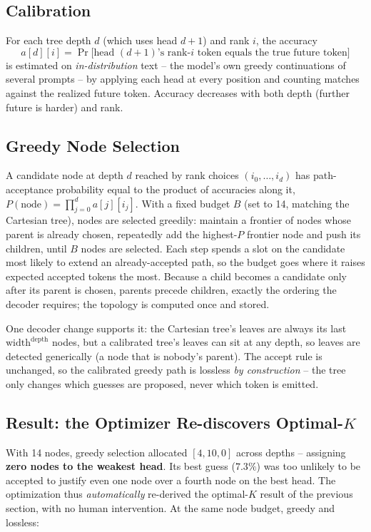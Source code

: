 \documentclass[12pt, a4paper]{article}
\begin{document}
\subsection{Calibration}
For each tree depth $d$ (which uses head $d{+}1$) and rank $i$, the accuracy
\[
a[d][i] = \Pr\big[\text{head } (d{+}1)\text{'s rank-}i \text{ token equals the true future token}\big]
\]
is estimated on \emph{in-distribution} text -- the model's own greedy continuations of several
prompts -- by applying each head at every position and counting matches against the realized
future token. Accuracy decreases with both depth (further future is harder) and rank.

\subsection{Greedy Node Selection}
A candidate node at depth $d$ reached by rank choices $(i_0,\dots,i_d)$ has path-acceptance
probability equal to the product of accuracies along it,
$P(\text{node}) = \prod_{j=0}^{d} a[j][i_j]$. With a fixed budget $B$ (set to 14, matching the
Cartesian tree), nodes are selected greedily: maintain a frontier of nodes whose parent is
already chosen, repeatedly add the highest-$P$ frontier node and push its children, until $B$
nodes are selected. Each step spends a slot on the candidate most likely to extend an
already-accepted path, so the budget goes where it raises expected accepted tokens the most.
Because a child becomes a candidate only after its parent is chosen, parents precede children,
exactly the ordering the decoder requires; the topology is computed once and stored.

One decoder change supports it: the Cartesian tree's leaves are always its last
$\text{width}^{\text{depth}}$ nodes, but a calibrated tree's leaves can sit at any depth, so
leaves are detected generically (a node that is nobody's parent). The accept rule is unchanged,
so the calibrated greedy path is lossless \emph{by construction} -- the tree only changes which
guesses are proposed, never which token is emitted.

\subsection{Result: the Optimizer Re-discovers Optimal-\texorpdfstring{$K$}{K}}
With 14 nodes, greedy selection allocated $[4, 10, 0]$ across depths -- assigning \textbf{zero
nodes to the weakest head}. Its best guess ($7.3\%$) was too unlikely to be accepted to justify
even one node over a fourth node on the best head. The optimization thus \emph{automatically}
re-derived the optimal-$K$ result of the previous section, with no human intervention. At the
same node budget, greedy and lossless:
\end{document}
